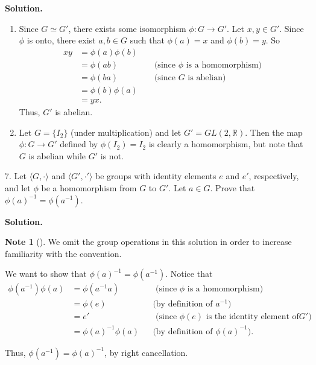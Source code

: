 \documentclass[10pt,]{book}
\theoremstyle{plain}
\theoremstyle{definition}
\theoremstyle{definition}
\newtheorem{note}[theorem]{Note}
\theoremstyle{definition}
\theoremstyle{definition}
\numberwithin{equation}{section}
\def\R{\mathbb{R}}
\newcommand{\amp}{&}
\begin{document}
\begin{exerciselist}
\begin{enumerate}[label=(\alph*)]
\end{enumerate}
\par\smallskip
\par\smallskip
\noindent\textbf{Solution.}\hypertarget{solution-26}{}\quad
\leavevmode%
\begin{enumerate}[label=(\alph*)]
\item\hypertarget{li-187}{}Since \(G\simeq G'\), there exists some isomorphism \(\phi:G\to G'\).  Let \(x,y\in G'\).  Since \(\phi\) is onto, there exist \(a,b\in G\) such that \(\phi(a)=x\) and \(\phi(b)=y\).  So%
\begin{align*}
xy\amp =\phi(a)\phi(b)\amp \amp\\
\amp =\phi(ab)\amp \amp \text{ (since \(\phi\) is a homomorphism) }\\
\amp =\phi(ba) \amp \amp \text{ (since \(G\) is abelian) }\\
\amp =\phi(b)\phi(a)\\
\amp =yx.
\end{align*}
Thus, \(G'\) is abelian.%
\item\hypertarget{li-188}{}Let \(G=\{I_2\}\) (under multiplication) and let \(G'=GL(2,\R)\). Then the map \(\phi: G\to G'\) defined by \(\phi(I_2)=I_2\) is clearly a homomorphism, but note that \(G\) is abelian while \(G'\) is not.%
\end{enumerate}
\item[7.]\hypertarget{exercise-27}{}Let \(\langle G,\cdot\rangle\) and \(\langle G',\cdot'\rangle\) be groups with identity elements \(e\) and \(e'\), respectively, and let \(\phi\) be a homomorphism from \(G\) to \(G'\). Let \(a\in G\). Prove that \(\phi(a)^{-1}=\phi(a^{-1})\).%
\par\smallskip
\par\smallskip
\noindent\textbf{Solution.}\hypertarget{solution-27}{}\quad
\begin{note}[]\label{note-8}
We omit the group operations in this solution in order to increase familiarity with the convention.%
\end{note}
We want to show that \(\phi(a)^{-1}=\phi(a^{-1})\). Notice that%
\begin{align*}
\phi(a^{-1})\phi(a)\amp =\phi(a^{-1}a)\amp \amp \text{ (since \(\phi\) is a homomorphism) }\\
\amp =\phi(e)\amp \amp \text{(by definition of \(a^{-1}\))}\\
\amp =e'\amp \amp  \text{ (since \(\phi(e)\) is the identity element of
\(G'\)) }\\
\amp =\phi(a)^{-1}\phi(a)\amp \amp \text{(by definition of \(\phi(a)^{-1}\))} .
\end{align*}
%
\par
Thus, \(\phi(a^{-1})=\phi(a)^{-1}\), by right cancellation.%
\end{exerciselist}
\typeout{************************************************}
\typeout{************************************************}
\end{document}
